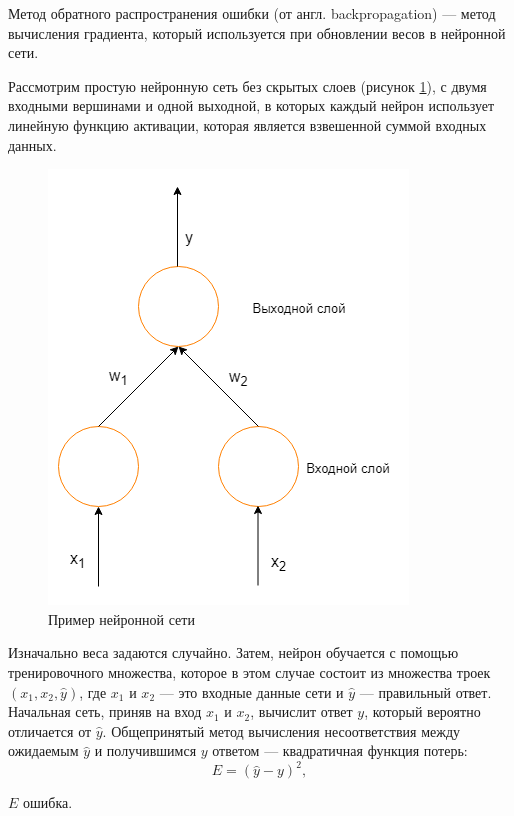 Метод обратного распространения ошибки (от англ. backpropagation) --- метод вычисления градиента, который используется при обновлении весов в нейронной сети.

Рассмотрим простую нейронную сеть без скрытых слоев (рисунок \ref{fig:simple}), с двумя входными вершинами и одной выходной, в которых каждый нейрон использует линейную функцию активации, которая является взвешенной суммой входных данных.

\begin{figure}[H]
	\centering
	\includegraphics[width=\textwidth]{img/simple.png}
	\caption{Пример нейронной сети}
	\label{fig:simple}
\end{figure}

Изначально веса задаются случайно. Затем, нейрон обучается с помощью тренировочного множества, которое в этом случае состоит из множества троек $(x_1, x_2, \hat{y})$, где $x_1$ и $x_2$ --- это входные данные сети и $\hat{y}$ --- правильный ответ. Начальная сеть, приняв на вход $x_1$ и $x_2$, вычислит ответ $y$, который вероятно отличается от $\hat{y}$. Общепринятый метод вычисления несоответствия между ожидаемым $\hat{y}$ и получившимся $y$ ответом --- квадратичная функция потерь:
\begin{equation}
	\label{eq:nn4}
	E = (\hat{y}-y)^2,
\end{equation}
\begin{eqexpl}[15mm]
	\item{$E$} ошибка.
\end{eqexpl}

